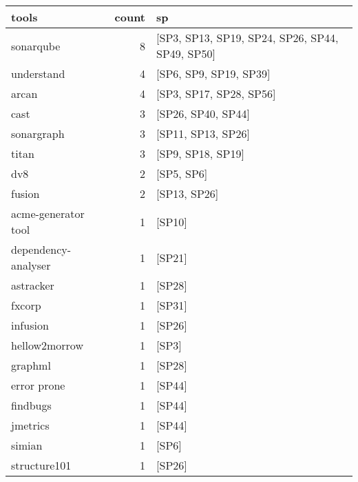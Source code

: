 \begin{tabular}{lrl}
\toprule
               tools &  count &                                               sp \\
\midrule
           sonarqube &      8 &  [SP3, SP13, SP19, SP24, SP26, SP44, SP49, SP50] \\
          understand &      4 &                           [SP6, SP9, SP19, SP39] \\
               arcan &      4 &                          [SP3, SP17, SP28, SP56] \\
                cast &      3 &                               [SP26, SP40, SP44] \\
          sonargraph &      3 &                               [SP11, SP13, SP26] \\
               titan &      3 &                                [SP9, SP18, SP19] \\
                 dv8 &      2 &                                       [SP5, SP6] \\
              fusion &      2 &                                     [SP13, SP26] \\
 acme-generator tool &      1 &                                           [SP10] \\
 dependency-analyser &      1 &                                           [SP21] \\
           astracker &      1 &                                           [SP28] \\
              fxcorp &      1 &                                           [SP31] \\
            infusion &      1 &                                           [SP26] \\
       hellow2morrow &      1 &                                            [SP3] \\
             graphml &      1 &                                           [SP28] \\
         error prone &      1 &                                           [SP44] \\
            findbugs &      1 &                                           [SP44] \\
            jmetrics &      1 &                                           [SP44] \\
              simian &      1 &                                            [SP6] \\
        structure101 &      1 &                                           [SP26] \\

\end{tabular}
